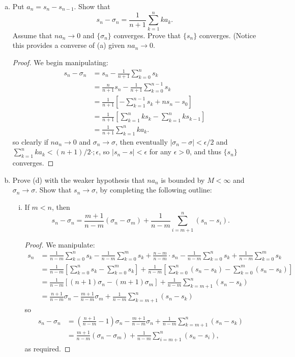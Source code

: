 \documentclass{scrbook}
\renewcommand{\to}{\rightarrow}
\begin{document}
\begin{enumerate}
\begin{enumerate}[(a)]
\item Put $a_n = s_n - s_{n-1}$. Show that
\[
    s_n - \sigma_n = \frac{1}{n + 1} \sum_{k=1}^{n} ka_k.
\]
Assume that $na_n \to 0$ and $\{\sigma_n\}$ converges. Prove that $\{s_n\}$ converges. (Notice this provides a converse of (a) given $na_n \to 0$.

\begin{proof}
    We begin manipulating:
    \begin{align*}
        s_n - \sigma_n &= s_n - \frac{1}{n + 1} \sum_{k=0}^{n} s_k \\
            &= \frac{n}{n + 1} s_n - \frac{1}{n + 1} \sum_{k=0}^{n - 1} s_k \\
            &= \frac{1}{n + 1} \left[-\sum_{k=1}^{n-1} s_k + ns_n - s_0 \right] \\
            &= \frac{1}{n + 1} \left[ \sum_{k=1}^{n} ks_k - \sum_{k=1}^{n}ks_{k-1}\right] \\
            &= \frac{1}{n + 1} \sum_{k=1}^{n} ka_k.
    \end{align*}
    so clearly if $na_n \to 0$ and $\sigma_n \to \sigma$, then eventually $|\sigma_n - \sigma| < \epsilon/2$ and $\sum_{k=1}^{n} ka_k < (n+1)/2 \cdot ;\epsilon$, so $|s_n - s| < \epsilon$ for any $\epsilon > 0$, and thus $\{s_n\}$ converges.
\end{proof}

\item Prove (d) with the weaker hypothesis that $na_n$ is bounded by $M < \infty$ and $\sigma_n \to \sigma$. Show that $s_n \to \sigma$, by completing the following outline:
\begin{enumerate}[(i)]
\item If $m < n$, then
\[
	s_n - \sigma_n = \frac{m+1}{n-m}(\sigma_n - \sigma_m) + \frac{1}{n-m}\sum_{i=m+1}^{n} (s_n - s_i).
\]

\begin{proof}
    We manipulate:
    \begin{align*}
        s_n &= \frac{1}{n-m} \sum_{k=0}^{n} s_k - \frac{1}{n-m}\sum_{k=0}^{m} s_k + \frac{n-m}{n-m} \cdot s_n - \frac{1}{n-m} \sum_{k=0}^{n} s_k + \frac{1}{n-m} \sum_{k=0}^{m} s_k \\
            &= \frac{1}{n-m} \left[ \sum_{k=0}^{n} s_k - \sum_{k=0}^{m} s_k \right] + \frac{1}{n-m} \left[ \sum_{k=0}^{n} (s_n - s_k) - \sum_{k=0}^{m}(s_n - s_k) \right] \\
            &= \frac{1}{n-m} \left[ (n+1)\sigma_n - (m+1)\sigma_m \right] + \frac{1}{n-m} \sum_{k=m+1}^{n} (s_n - s_k) \\
            &= \frac{n+1}{n-m} \sigma_n - \frac{m+1}{n-m} \sigma_m + \frac{1}{n-m} \sum_{k=m+1}^{n} (s_n - s_k)
    \end{align*}
    so
    \begin{align*}
        s_n - \sigma_n &= \left( \frac{n+1}{n-m} - 1 \right) \sigma_n - \frac{m+1}{n-m} \sigma_n + \frac{1}{n-m} \sum_{k=m+1}^{n} (s_n - s_k) \\
            &= \frac{m+1}{n-m}(\sigma_n - \sigma_m) + \frac{1}{n-m} \sum_{i=m+1}^{n} (s_n - s_i),
    \end{align*}
    as required.
\end{proof}


\end{enumerate}
\end{enumerate}
\end{enumerate}
\end{document}
